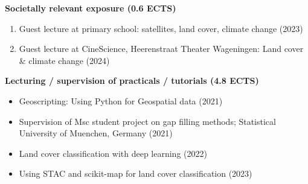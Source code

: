 \textbf{Societally relevant exposure (0.6 ECTS)}
\begin{enumerate}[nolistsep]
    \item Guest lecture at primary school: satellites, land cover, climate change (2023)
    \item Guest lecture at CineScience, Heerenstraat Theater Wageningen: Land cover \& climate change (2024)
\end{enumerate}

\textbf{Lecturing / supervision of practicals / tutorials (4.8 ECTS)}
\begin{itemize}[nolistsep]
    \item Geoscripting: Using Python for Geospatial data (2021)
    \item Supervision of Msc student project on gap filling methods; Statistical University of Muenchen, Germany (2021)
    \item Land cover classification with deep learning (2022)
    \item Using STAC and scikit-map for land cover classification (2023)
\end{itemize}
